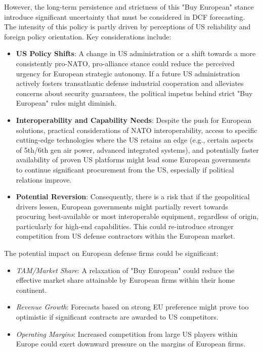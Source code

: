 However, the long-term persistence and strictness of this "Buy European" stance introduce significant uncertainty that must be considered in DCF forecasting. The intensity of this policy is partly driven by perceptions of US reliability and foreign policy orientation. Key considerations include:
\begin{itemize}
    \item \textbf{US Policy Shifts}: A change in US administration or a shift towards a more consistently pro-NATO, pro-alliance stance could reduce the perceived urgency for European strategic autonomy. If a future US administration actively fosters transatlantic defense industrial cooperation and alleviates concerns about security guarantees, the political impetus behind strict "Buy European" rules might diminish.
    \item \textbf{Interoperability and Capability Needs}: Despite the push for European solutions, practical considerations of NATO interoperability, access to specific cutting-edge technologies where the US retains an edge (e.g., certain aspects of 5th/6th gen air power, advanced integrated systems), and potentially faster availability of proven US platforms might lead some European governments to continue significant procurement from the US, especially if political relations improve.
    \item \textbf{Potential Reversion}: Consequently, there is a risk that if the geopolitical drivers lessen, European governments might partially revert towards procuring best-available or most interoperable equipment, regardless of origin, particularly for high-end capabilities. This could re-introduce stronger competition from US defense contractors within the European market.
\end{itemize}
The potential impact on European defense firms could be significant:
\begin{itemize}
    \item \textit{TAM/Market Share}: A relaxation of "Buy European" could reduce the effective market share attainable by European firms within their home continent.
    \item \textit{Revenue Growth}: Forecasts based on strong EU preference might prove too optimistic if significant contracts are awarded to US competitors.
    \item \textit{Operating Margins}: Increased competition from large US players within Europe could exert downward pressure on the margins of European firms.
\end{itemize}

